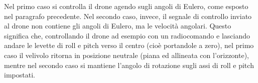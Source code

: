 Nel primo caso si controlla il drone agendo sugli angoli di Eulero, come esposto nel paragrafo precedente. Nel secondo caso, invece, il segnale di controllo inviato al drone non contiene gli angoli di Eulero, ma le velocità angolari. Questo significa che, controllando il drone ad esempio con un radiocomando e lasciando andare le levette di roll e pitch verso il centro (cioè portandole a zero), nel primo caso il velivolo ritorna in posizione neutrale (piana ed allineata con l'orizzonte), mentre nel secondo caso si mantiene l'angolo di rotazione sugli assi di roll e pitch impostati.
